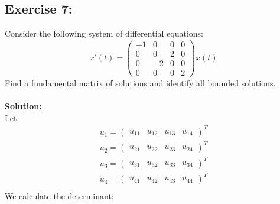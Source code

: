 \documentclass{article}
\begin{document}
\subsection{Exercise 7:}
Consider the following system of differential equations: \\
$$x'(t) = 
\begin{pmatrix}
    -1 & 0 & 0 & 0 \\
    0 & 0 & 2 & 0 \\
    0 & -2 & 0 & 0 \\
    0 & 0 & 0 & 2
\end{pmatrix} 
x(t)$$
Find a fundamental matrix of solutions and identify all bounded solutions. \\ \\
\textbf{Solution:} \\
Let:
\begin{align*}
    u_{1} =
    \begin{pmatrix}
        u_{11} & u_{12} & u_{13} & u_{14} 
    \end{pmatrix}^T \\
    u_{2} =
    \begin{pmatrix}
        u_{21} & u_{22} & u_{23} & u_{24}
    \end{pmatrix}^T \\
    u_{3} = 
    \begin{pmatrix}
        u_{31} & u_{32} & u_{33} & u_{34}
    \end{pmatrix}^T \\
    u_{4} =
    \begin{pmatrix}
        u_{41} & u_{42} & u_{43} & u_{44}
    \end{pmatrix}^T \\
\end{align*}
We calculate the determinant: \\
\end{document}
